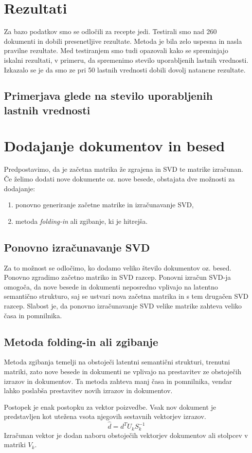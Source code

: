 \documentclass{article}
\begin{document}
\section{Rezultati}
Za bazo podatkov smo se odločili za recepte jedi. Testirali smo nad 260 dokumenti in dobili presenetljive rezultate. Metoda je bila zelo uspesna in nasla pravilne rezultate. Med testiranjem smo tudi opazovali kako se spreminjajo iskalni rezultati, v primeru, da spremenimo stevilo uporabljenih lastnih vrednosti. Izkazalo se je da smo ze pri 50 lastnih vrednosti dobili dovolj natancne rezultate.

\subsection{Primerjava glede na stevilo uporabljenih lastnih vrednosti}


\section{Dodajanje dokumentov in besed}
Predpostavimo, da je začetna matrika že zgrajena in SVD te matrike izračunan. Če želimo dodati nove dokumente oz. nove besede, obstajata dve možnosti za dodajanje:
\begin{enumerate}
    \item ponovno generiranje začetne matrike in izračunavanje SVD,
    \item metoda \textit{folding-in} ali zgibanje, ki je hitrejša.
\end{enumerate}
\subsection{Ponovno izračunavanje SVD}
 Za to možnost se odločimo, ko dodamo veliko število dokumentov oz. besed. Ponovno zgradimo začetno matriko in SVD razcep. Ponovni izračun SVD-ja omogoča, da nove besede in dokumenti neposredno vplivajo na latentno semantično strukturo, saj se ustvari nova začetna matrika in s tem drugačen SVD razcep. Slabost je, da ponovno izračunavanje SVD velike matrike zahteva veliko časa in pomnilnika.
\subsection{Metoda \textbf{folding-in} ali zgibanje}
\par Metoda zgibanja temelji na obstoječi latentni semantični strukturi, trenutni matriki, zato nove besede in dokumenti ne vplivajo na prestavitev ze obstoječih izrazov in dokumentov. Ta metoda zahteva manj časa in pomnilnika, vendar lahko poslabša prestavitev novih izrazov in dokumentov.
\par Postopek je enak postopku za vektor poizvedbe. Vsak nov dokument je predstavljen kot utežena vsota njegovih sestavnih vektorjev izrazov.
\[ \hat{d} = d^TU_kS^{-1}_k\]
Izračunan vektor je dodan naboru obstoječih vektorjev dokumentov ali stolpcev v matriki $V_k$. \\
\end{document}
